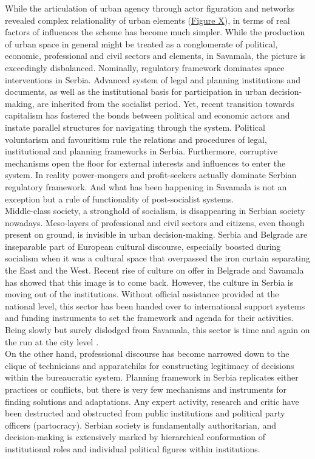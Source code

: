 \documentclass[11pt]{report}
\begin{document}
{{{While the articulation of urban agency through actor figuration and networks revealed complex relationality of urban elements (\href{ANT diagram}{Figure X}), in terms of real factors of influences the scheme has become much simpler.
While the production of urban space in general might be treated as a conglomerate of political, economic, professional and civil sectors and elements, in Savamala, the picture is exceedingly disbalanced.
Nominally, regulatory framework dominates space interventions in Serbia.
Advanced system of legal and planning institutions and documents, as well as the institutional basis for participation in urban decision-making, are inherited from the socialist period.
Yet, recent transition towards capitalism has fostered the bonds between political and economic actors and instate parallel structures for navigating through the system.
Political voluntarism and favouritism rule the relations and procedures of legal, institutional and planning frameworks in Serbia.
Furthermore, corruptive mechanisms open the floor for external interests and influences to enter the system.
In reality power-mongers and profit-seekers actually dominate Serbian regulatory framework. 
And what has been happening in Savamala is not an exception but a rule of functionality of post-socialist systems.
\\

Middle-class society, a stronghold of socialism, is disappearing in Serbian society nowadays. 
Meso-layers of professional and civil sectors and citizens, even though present on ground, is invisible in urban decision-making.
Serbia and Belgrade are inseparable part of European cultural discourse, especially boosted during socialism when it was a cultural space that overpassed the iron curtain separating the East and the West.
Recent rise of culture on offer in Belgrade and Savamala has showed that this image is to come back.
However, the culture in Serbia is moving out of the institutions.
Without official  assistance provided at the national level, this sector has been handed over to international support systems and funding instruments to set the framework and agenda for their activities. Being slowly but surely dislodged from Savamala, this sector is time and again on the run at the city level .
\\

On the other hand, professional discourse has become narrowed down to the clique of technicians and apparatchiks for constructing legitimacy of decisions within the bureaucratic system. 
Planning framework in Serbia replicates either practices or conflicts, but there is very few mechanisms and instruments for finding solutions and adaptations.
Any expert activity, research and critic have been destructed and obstructed from public institutions and political party officers (partocracy).
Serbian society is fundamentally authoritarian, and decision-making is extensively marked by hierarchical conformation of institutional roles and individual political figures within institutions.
\\

}}}
\end{document}
